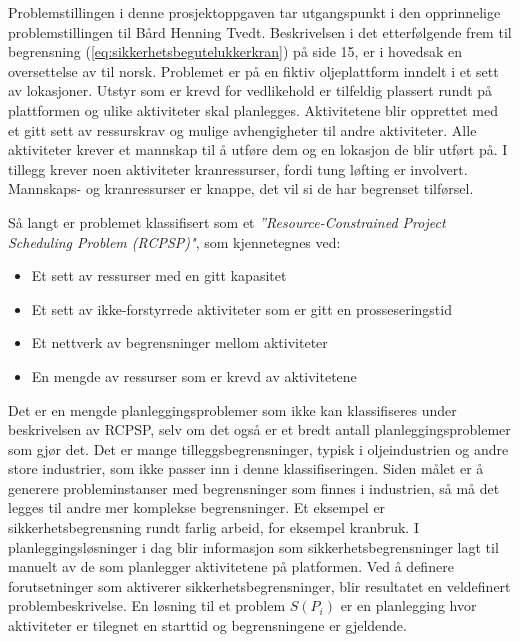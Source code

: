 Problemstillingen i denne prosjektoppgaven tar utgangspunkt i den opprinnelige problemstillingen til Bård Henning Tvedt. Beskrivelsen i det etterfølgende frem til begrensning (\ref{eq:sikkerhetsbegutelukkerkran}) på side 15, er i hovedsak en oversettelse av \cite{tvedtbezem} til norsk. Problemet er på en fiktiv oljeplattform inndelt i et sett av lokasjoner. Utstyr som er krevd for vedlikehold er tilfeldig plassert rundt på plattformen og ulike aktiviteter skal planlegges. Aktivitetene blir opprettet med et gitt sett av ressurskrav og mulige avhengigheter til andre aktiviteter. Alle aktiviteter krever et mannskap til å utføre dem og en lokasjon de blir utført på. I tillegg krever noen aktiviteter kranressurser, fordi tung løfting er involvert. Mannskaps- og kranressurser er knappe, det vil si de har begrenset tilførsel.

Så langt er problemet klassifisert som et \textit{''Resource-Constrained Project Scheduling Problem (RCPSP)"}\cite{RcpspPaperSchutt}, som kjennetegnes ved:
\begin{itemize}
\item Et sett av ressurser med en gitt kapasitet
\item Et sett av ikke-forstyrrede aktiviteter som er gitt en prosseseringstid
\item Et nettverk av begrensninger mellom aktiviteter
\item En mengde av ressurser som er krevd av aktivitetene
\end{itemize}

Det er en mengde planleggingsproblemer som ikke kan klassifiseres under beskrivelsen av RCPSP, selv om det også er et bredt antall planleggingsproblemer som gjør det. Det er mange tilleggsbegrensninger, typisk i oljeindustrien og andre store industrier, som ikke passer inn i denne klassifiseringen. Siden målet er å generere probleminstanser med begrensninger som finnes i industrien, så må det legges til andre mer komplekse begrensninger. Et eksempel  er sikkerhetsbegrensning rundt farlig arbeid, for eksempel kranbruk. I planleggingsløsninger i dag blir informasjon som sikkerhetsbegrensninger lagt til manuelt av de som planlegger aktivitetene på platformen. Ved å definere forutsetninger som aktiverer sikkerhetsbegrensninger, blir resultatet en veldefinert problembeskrivelse. En løsning til et problem $ S(P_{i}) $ er en planlegging hvor aktiviteter er tilegnet en starttid og begrensningene er gjeldende.

